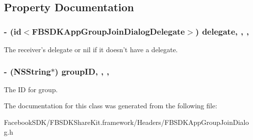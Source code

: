 \subsection{Property Documentation}
\hypertarget{interface_f_b_s_d_k_app_group_join_dialog_a3ee58c32085dab11678cbd1805d62231}{
\subsubsection[{delegate}]{\setlength{\rightskip}{0pt plus 5cm}-\/ (id$<${\bf F\-B\-S\-D\-K\-App\-Group\-Join\-Dialog\-Delegate}$>$) delegate\hspace{0.3cm}{\ttfamily [read]}, {\ttfamily [write]}, {\ttfamily [nonatomic]}, {\ttfamily [weak]}}}\label{interface_f_b_s_d_k_app_group_join_dialog_a3ee58c32085dab11678cbd1805d62231}
The receiver's delegate or nil if it doesn't have a delegate. \hypertarget{interface_f_b_s_d_k_app_group_join_dialog_aceeba0e2821c837cd9ae2caf3d6ea890}{
\subsubsection[{group\-I\-D}]{\setlength{\rightskip}{0pt plus 5cm}-\/ (N\-S\-String$\ast$) group\-I\-D\hspace{0.3cm}{\ttfamily [read]}, {\ttfamily [write]}, {\ttfamily [nonatomic]}, {\ttfamily [copy]}}}\label{interface_f_b_s_d_k_app_group_join_dialog_aceeba0e2821c837cd9ae2caf3d6ea890}
The I\-D for group. 

The documentation for this class was generated from the following file\-:\begin{DoxyCompactItemize}
\item 
Facebook\-S\-D\-K/\-F\-B\-S\-D\-K\-Share\-Kit.\-framework/\-Headers/F\-B\-S\-D\-K\-App\-Group\-Join\-Dialog.\-h\end{DoxyCompactItemize}
